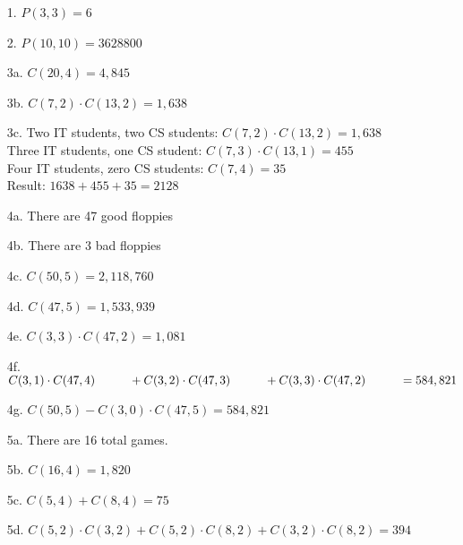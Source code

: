 
\newcommand{\laClass}       {CS 211}
\newcommand{\laSemester}    {Spring 2018}
\newcommand{\laChapter}     {5.3}
\newcommand{\laType}        {Exercise}
\newcommand{\laPoints}      {5}
\newcommand{\laTitle}       {Combinations}
\newcommand{\laDate}        {Jan 23, 2018}
\setcounter{chapter}{5}
\setcounter{section}{3}
\addtocounter{section}{-1}

\toggletrue{answerkey}





    \begin{itemize}
        \item[1.]   $P(3,3) = 6$
        
        \item[2.]   $P(10, 10) = 3628800$
        
        \item[3a.]  $C(20,4) = 4,845$
        \item[3b.]  $C(7,2) \cdot C(13,2) = 1,638$
        \item[3c.]  Two IT students, two CS students: $C(7,2) \cdot C(13,2) = 1,638$ \\
                    Three IT students, one CS student: $C(7,3) \cdot C(13,1) = 455$ \\
                    Four IT students, zero CS students: $C(7, 4) = 35$ \\
                    Result: $ 1638 + 455 + 35 = 2128 $

        \item[4a.]  There are 47 good floppies
        \item[4b.]  There are 3 bad floppies
        \item[4c.]  $C(50,5) = 2,118,760$
        \item[4d.]  $C(47,5) = 1,533,939$
        \item[4e.]  $C(3,3) \cdot C(47,2) = 1,081$
        \item[4f.]  $C(3,1) \cdot C(47,4) \hspace*{1cm} + C(3,2) \cdot C(47,3) \hspace*{1cm} + C(3,3) \cdot C(47,2) \hspace*{1cm} = 584,821$ \\
        \item[4g.]  $C(50,5) - C(3,0) \cdot C(47,5) = 584,821$

        \item[5a.]  There are 16 total games.
        \item[5b.]  $C(16,4) = 1,820$
        \item[5c.]  $C(5,4) + C(8,4) = 75$
        \item[5d.]  $C(5,2) \cdot C(3,2) + C(5,2) \cdot C(8,2) + C(3,2) \cdot C(8,2) = 394$
    \end{itemize}



